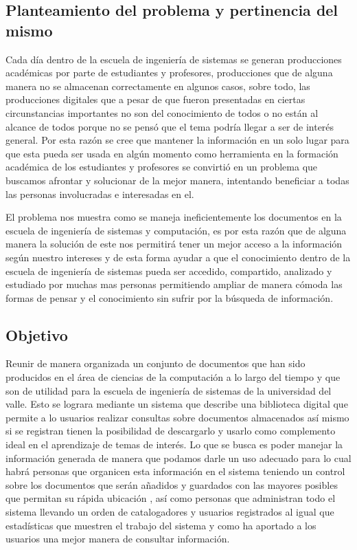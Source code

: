 \documentclass[]{article}
\begin{document}
	\subsection{Planteamiento del problema y pertinencia del mismo}
	Cada día dentro de la escuela de ingeniería de sistemas se generan producciones académicas por
	parte de estudiantes y profesores, producciones que de alguna manera no se almacenan
	correctamente en algunos casos, sobre todo, las producciones digitales que a pesar de que fueron
	presentadas en ciertas circunstancias importantes no son del conocimiento de todos o no están al
	alcance de todos porque no se pensó que el tema podría llegar a ser de interés general. Por esta
	razón se cree que mantener la información en un solo lugar para que esta pueda ser usada en algún
	momento como herramienta en la formación académica de los estudiantes y profesores se convirtió
	en un problema que buscamos afrontar y solucionar de la mejor manera, intentando beneficiar  a
	todas las personas involucradas e interesadas en el.

	El problema nos muestra como se maneja ineficientemente los documentos en la escuela de
	ingeniería de sistemas y computación, es por esta razón que de alguna manera la solución de este
	nos permitirá tener un mejor acceso a la información según nuestro intereses y de esta forma
	ayudar a que el conocimiento dentro de la escuela de ingeniería de sistemas pueda ser accedido,
	compartido, analizado y estudiado por muchas mas personas permitiendo ampliar de manera cómoda
	las formas de pensar y el conocimiento sin sufrir por la búsqueda de información.
	
	\subsection{Objetivo}
	Reunir de manera organizada un conjunto de documentos que han sido producidos en el área de
	ciencias de la computación a lo largo del tiempo y que son de utilidad para  la escuela de
	ingeniería de sistemas de la universidad del valle. Esto se lograra  mediante un sistema que
	describe una biblioteca digital  que permite  a lo usuarios realizar consultas sobre  documentos
	almacenados así mismo si se registran tienen la posibilidad de descargarlo y usarlo como
	complemento ideal en el aprendizaje de temas de interés. Lo que se busca es poder manejar la
	información generada de manera que podamos darle un uso adecuado para lo cual habrá personas que
	organicen esta información en el sistema teniendo un control sobre los documentos que serán
	añadidos y guardados con las mayores posibles que permitan su rápida ubicación , así como
	personas que administran todo el sistema llevando un orden de catalogadores y usuarios
	registrados al igual que estadísticas que muestren el trabajo del sistema y como ha aportado a
	los usuarios una mejor manera de consultar información.
\end{document}
